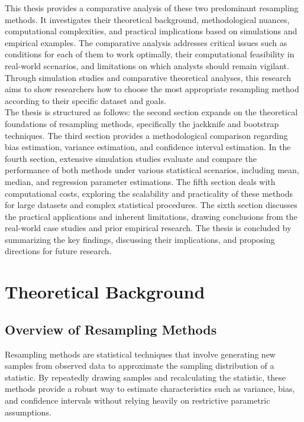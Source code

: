 \documentclass{article}
\begin{document}
This thesis provides a comparative analysis of these two predominant resampling methods. It investigates their theoretical background, methodological nuances, computational complexities, and practical implications based on simulations and empirical examples. The comparative analysis addresses critical issues such as conditions for each of them to work optimally, their computational feasibility in real-world scenarios, and limitations on which analysts should remain vigilant. Through simulation studies and comparative theoretical analyses, this research aims to show researchers how to choose the most appropriate resampling method according to their specific dataset and goals. \\

The thesis is structured as follows: the second section expands on the theoretical foundations of resampling methods, specifically the jackknife and bootstrap techniques. The third section provides a methodological comparison regarding bias estimation, variance estimation, and confidence interval estimation. In the fourth section, extensive simulation studies evaluate and compare the performance of both methods under various statistical scenarios, including mean, median, and regression parameter estimations. The fifth section deals with computational costs, exploring the scalability and practicality of these methods for large datasets and complex statistical procedures. The sixth section discusses the practical applications and inherent limitations, drawing conclusions from the real-world case studies and prior empirical research. The thesis is concluded by summarizing the key findings, discussing their implications, and proposing directions for future research. \\


\section{Theoretical Background}

\subsection{Overview of Resampling Methods}

Resampling methods are statistical techniques that involve generating new samples from observed data to approximate the sampling distribution of a statistic. By repeatedly drawing samples and recalculating the statistic, these methods provide a robust way to estimate characteristics such as variance, bias, and confidence intervals without relying heavily on restrictive parametric assumptions. \\
\end{document}
